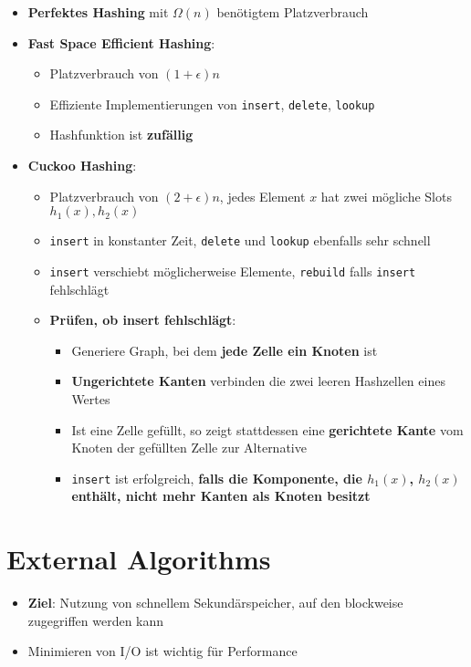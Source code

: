 \documentclass[10pt,a4paper]{article}
\begin{document}
	\begin{itemize}
		\item \textbf{Perfektes Hashing} mit $\Omega(n)$ benötigtem Platzverbrauch
		\item \textbf{Fast Space Efficient Hashing}:
		\begin{itemize}
			\item Platzverbrauch von $(1 + \epsilon)n$
			\item Effiziente Implementierungen von \texttt{insert}, \texttt{delete}, \texttt{lookup}
			\item Hashfunktion ist \textbf{zufällig}
		\end{itemize}
		\item \textbf{Cuckoo Hashing}:
		\begin{itemize}
			\item Platzverbrauch von $(2 + \epsilon)n$, jedes Element $x$ hat zwei mögliche Slots $h_1(x), h_2(x)$
			\item \texttt{insert} in konstanter Zeit, \texttt{delete} und \texttt{lookup} ebenfalls sehr schnell
			\item \texttt{insert} verschiebt möglicherweise Elemente, \texttt{rebuild} falls \texttt{insert} fehlschlägt
			\item \textbf{Prüfen, ob insert fehlschlägt}:
			\begin{itemize}
				\item Generiere Graph, bei dem \textbf{jede Zelle ein Knoten} ist
				\item \textbf{Ungerichtete Kanten} verbinden die zwei leeren Hashzellen eines Wertes
				\item Ist eine Zelle gefüllt, so zeigt stattdessen eine \textbf{gerichtete Kante} vom Knoten der gefüllten Zelle zur Alternative
				\item \texttt{insert} ist erfolgreich, \textbf{falls die Komponente, die $h_1(x)$, $h_2(x)$ enthält, nicht mehr Kanten als Knoten besitzt}
			\end{itemize}
		\end{itemize}
	\end{itemize}

	\newpage
	\section{External Algorithms}
	\label{ea:sec:external_algorithms}
	
	\begin{itemize}
		\item \textbf{Ziel}: Nutzung von schnellem Sekundärspeicher, auf den blockweise zugegriffen werden kann
		\item Minimieren von I/O ist wichtig für Performance
	\end{itemize}
\end{document}
